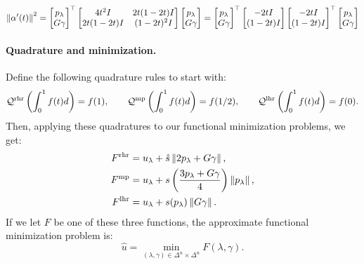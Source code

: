\documentclass[eikonal.tex]{subfiles}
\begin{document}
\begin{equation}
  \left\|\alpha'(t)\right\|^2 = \begin{bmatrix} p_\lambda \\ G\gamma \end{bmatrix}^\top \begin{bmatrix} 4t^2 I & 2t(1-2t)I \\ 2t(1-2t)I & (1-2t)^2I \end{bmatrix} \begin{bmatrix} p_\lambda \\ G\gamma \end{bmatrix} = \begin{bmatrix} p_\lambda \\ G\gamma \end{bmatrix}^\top \begin{bmatrix} -2t I \\ (1 - 2t)I \end{bmatrix}\begin{bmatrix} -2t I \\ (1 - 2t)I \end{bmatrix}^\top \begin{bmatrix} p_\lambda \\ G\gamma \end{bmatrix}
\end{equation}

\paragraph{Quadrature and minimization.} Define the following
quadrature rules to start with:
\begin{equation}
  \mathcal{Q}^{\operatorname{rhr}}\left(\int_0^1 f(t) d\right) = f(1), \qquad \mathcal{Q}^{\operatorname{mp}}\left(\int_0^1 f(t) d\right) = f(1/2), \qquad \mathcal{Q}^{\operatorname{lhr}}\left(\int_0^1 f(t) d\right) = f(0).
\end{equation}
Then, applying these quadratures to our functional minimization
problems, we get:
\begin{align}
  F^{\operatorname{rhr}} &= u_\lambda + \hat{s} \left\|2p_\lambda + G\gamma\right\|, \\
  F^{\operatorname{mp}} &= u_\lambda + s\left(\frac{3p_\lambda + G\gamma}{4}\right) \left\|p_\lambda\right\|, \\
  F^{\operatorname{lhr}} &= u_\lambda + s(p_\lambda) \left\|G\gamma\right\|.
\end{align}
If we let $F$ be one of these three functions, the approximate
functional minimization problem is:
\begin{equation}
  \hat{u} = \min_{(\lambda, \gamma) \in \Delta^n \times \Delta^n} F(\lambda, \gamma).
\end{equation}
\end{document}
